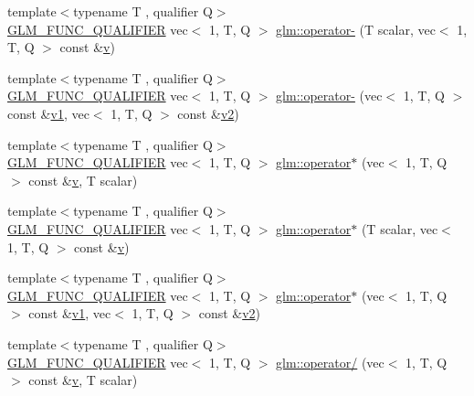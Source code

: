 \begin{DoxyCompactItemize}
\item 
{\footnotesize template$<$typename T , qualifier Q$>$ }\\\hyperlink{setup_8hpp_a33fdea6f91c5f834105f7415e2a64407}{G\+L\+M\+\_\+\+F\+U\+N\+C\+\_\+\+Q\+U\+A\+L\+I\+F\+I\+ER} vec$<$ 1, T, Q $>$ \hyperlink{group__ext__vec1_gad9a7982cee48942a4832b505993b7851}{glm\+::operator-\/} (T scalar, vec$<$ 1, T, Q $>$ const \&\hyperlink{_s_d_l__opengl_8h_a10a82eabcb59d2fcd74acee063775f90}{v})
\item 
{\footnotesize template$<$typename T , qualifier Q$>$ }\\\hyperlink{setup_8hpp_a33fdea6f91c5f834105f7415e2a64407}{G\+L\+M\+\_\+\+F\+U\+N\+C\+\_\+\+Q\+U\+A\+L\+I\+F\+I\+ER} vec$<$ 1, T, Q $>$ \hyperlink{group__ext__vec1_gae339bd1ed8702767da0b5faacbc860ce}{glm\+::operator-\/} (vec$<$ 1, T, Q $>$ const \&\hyperlink{_s_d_l__opengl__glext_8h_a435c176a02c061b43e19bdf7c86cceae}{v1}, vec$<$ 1, T, Q $>$ const \&\hyperlink{_s_d_l__opengl__glext_8h_a0928f6d0f0f794ba000a21dfae422136}{v2})
\item 
{\footnotesize template$<$typename T , qualifier Q$>$ }\\\hyperlink{setup_8hpp_a33fdea6f91c5f834105f7415e2a64407}{G\+L\+M\+\_\+\+F\+U\+N\+C\+\_\+\+Q\+U\+A\+L\+I\+F\+I\+ER} vec$<$ 1, T, Q $>$ \hyperlink{group__ext__vec1_ga3831734bcbc3a7d64ddce316291d7a31}{glm\+::operator$\ast$} (vec$<$ 1, T, Q $>$ const \&\hyperlink{_s_d_l__opengl_8h_a10a82eabcb59d2fcd74acee063775f90}{v}, T scalar)
\item 
{\footnotesize template$<$typename T , qualifier Q$>$ }\\\hyperlink{setup_8hpp_a33fdea6f91c5f834105f7415e2a64407}{G\+L\+M\+\_\+\+F\+U\+N\+C\+\_\+\+Q\+U\+A\+L\+I\+F\+I\+ER} vec$<$ 1, T, Q $>$ \hyperlink{group__ext__vec1_ga83636331813fdbfe423afc01de1f38aa}{glm\+::operator$\ast$} (T scalar, vec$<$ 1, T, Q $>$ const \&\hyperlink{_s_d_l__opengl_8h_a10a82eabcb59d2fcd74acee063775f90}{v})
\item 
{\footnotesize template$<$typename T , qualifier Q$>$ }\\\hyperlink{setup_8hpp_a33fdea6f91c5f834105f7415e2a64407}{G\+L\+M\+\_\+\+F\+U\+N\+C\+\_\+\+Q\+U\+A\+L\+I\+F\+I\+ER} vec$<$ 1, T, Q $>$ \hyperlink{group__ext__vec1_ga902773a560c5478d0a2c0e5d8343b504}{glm\+::operator$\ast$} (vec$<$ 1, T, Q $>$ const \&\hyperlink{_s_d_l__opengl__glext_8h_a435c176a02c061b43e19bdf7c86cceae}{v1}, vec$<$ 1, T, Q $>$ const \&\hyperlink{_s_d_l__opengl__glext_8h_a0928f6d0f0f794ba000a21dfae422136}{v2})
\item 
{\footnotesize template$<$typename T , qualifier Q$>$ }\\\hyperlink{setup_8hpp_a33fdea6f91c5f834105f7415e2a64407}{G\+L\+M\+\_\+\+F\+U\+N\+C\+\_\+\+Q\+U\+A\+L\+I\+F\+I\+ER} vec$<$ 1, T, Q $>$ \hyperlink{group__ext__vec1_ga5f0627715e89fde4a13b5655961df660}{glm\+::operator/} (vec$<$ 1, T, Q $>$ const \&\hyperlink{_s_d_l__opengl_8h_a10a82eabcb59d2fcd74acee063775f90}{v}, T scalar)

\end{DoxyCompactItemize}
